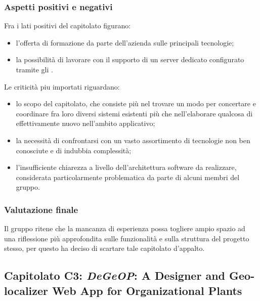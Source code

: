 		\subsubsection{Aspetti positivi e negativi}
		Fra i lati positivi del capitolato figurano:
		\begin{itemize}
			\item l'offerta di formazione da parte dell'azienda sulle principali tecnologie;
			\item la possibilità di lavorare con il supporto di un server dedicato configurato tramite gli .
		\end{itemize}
		Le criticità piu importati riguardano:
		\begin{itemize}
			\item lo scopo del capitolato, che consiste più nel trovare un modo per concertare e coordinare fra loro diversi sistemi 
			esistenti più che nell'elaborare qualcosa di effettivamente nuovo nell'ambito applicativo;
			\item la necessità di confrontarsi con un vasto assortimento di tecnologie non ben conosciute e di indubbia complessità;
			\item l'insufficiente chiarezza a livello dell'architettura software da realizzare, considerata particolarmente problematica da 
			parte di alcuni membri del gruppo.
		\end{itemize}
		\subsubsection{Valutazione finale}
		Il gruppo ritene che la mancanza di esperienza possa togliere ampio spazio ad una riflessione più approfondita sulle funzionalità e sulla 
		struttura del progetto stesso, per questo ha deciso di scartare tale capitolato d'appalto.
		
	\subsection{Capitolato C3: \emph{DeGeOP}: A Designer and Geo-localizer Web App for Organizational Plants}

